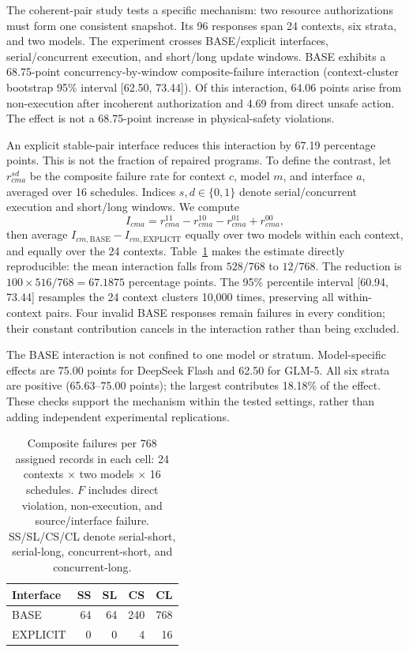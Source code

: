 \documentclass[letterpaper,10pt,conference]{ieeeconf}
\begin{document}
The coherent-pair study tests a specific mechanism: two resource authorizations must form one consistent snapshot. Its 96 responses span 24 contexts, six strata, and two models. The experiment crosses BASE/explicit interfaces, serial/concurrent execution, and short/long update windows. BASE exhibits a 68.75-point concurrency-by-window composite-failure interaction (context-cluster bootstrap 95\% interval [62.50, 73.44]). Of this interaction, 64.06 points arise from non-execution after incoherent authorization and 4.69 from direct unsafe action. The effect is not a 68.75-point increase in physical-safety violations.

An explicit stable-pair interface reduces this interaction by 67.19 percentage points. This is not the fraction of repaired programs. To define the contrast, let $r_{cma}^{sd}$ be the composite failure rate for context $c$, model $m$, and interface $a$, averaged over 16 schedules. Indices $s,d\in\{0,1\}$ denote serial/concurrent execution and short/long windows. We compute
\begin{equation}
 I_{cma}=r_{cma}^{11}-r_{cma}^{10}-r_{cma}^{01}+r_{cma}^{00},
 \label{eq:interaction}
\end{equation}
then average $I_{cm,\mathrm{BASE}}-I_{cm,\mathrm{EXPLICIT}}$ equally over two models within each context, and equally over the 24 contexts. Table~\ref{tab:interactioncounts} makes the estimate directly reproducible: the mean interaction falls from $528/768$ to $12/768$. The reduction is $100\times516/768=67.1875$ percentage points. The 95\% percentile interval [60.94, 73.44] resamples the 24 context clusters 10,000 times, preserving all within-context pairs. Four invalid BASE responses remain failures in every condition; their constant contribution cancels in the interaction rather than being excluded.

The BASE interaction is not confined to one model or stratum. Model-specific effects are 75.00 points for DeepSeek Flash and 62.50 for GLM-5. All six strata are positive (65.63--75.00 points); the largest contributes 18.18\% of the effect. These checks support the mechanism within the tested settings, rather than adding independent experimental replications.

\begin{table}[t]
\vspace{5pt}
\caption{Composite failures per 768 assigned records in each cell: 24 contexts $\times$ two models $\times$ 16 schedules. $F$ includes direct violation, non-execution, and source/interface failure. SS/SL/CS/CL denote serial-short, serial-long, concurrent-short, and concurrent-long.}
\label{tab:interactioncounts}
\centering\small
\begin{tabular}{lrrrr}
\toprule
Interface&SS&SL&CS&CL\\
\midrule
BASE&64&64&240&768\\
EXPLICIT&0&0&4&16\\
\bottomrule
\end{tabular}
\end{table}
\end{document}

